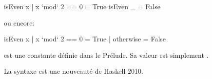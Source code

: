 \begin{haskellcode}
isEven x | x `mod` 2 == 0 = True
isEven _ = False
\end{haskellcode}

ou encore:

\begin{haskellcode}
isEven x | x `mod` 2 == 0 = True
         | otherwise = False
\end{haskellcode}

\begin{infobox}
 est une constante définie dans le Prélude. Sa valeur est simplement .
\end{infobox}

\begin{compatbox}
La syntaxe  est une nouveauté de Haskell 2010.
\end{compatbox}

